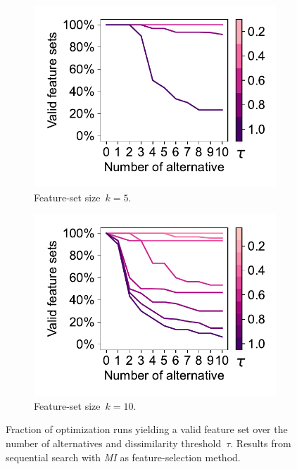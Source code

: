\documentclass{article}
\theoremstyle{definition}
\begin{document}
\begin{figure}[htbp]
	\centering
	\begin{subfigure}[t]{0.48\textwidth}
		\centering
		\includegraphics[width=\textwidth, trim=15 15 10 15, clip]{plots/afs-impact-num-alternatives-tau-optimization-status-k-5.pdf}
		\caption{Feature-set size~$k=5$.}
		\label{fig:afs:impact-num-alternatives-tau-optimization-status-k-5}
	\end{subfigure}
	\hfill
	\begin{subfigure}[t]{0.48\textwidth}
		\centering
		\includegraphics[width=\textwidth, trim=15 15 10 15, clip]{plots/afs-impact-num-alternatives-tau-optimization-status-k-10.pdf}
		\caption{Feature-set size~$k=10$.}
		\label{fig:afs:impact-num-alternatives-tau-optimization-status-k-10}
	\end{subfigure}
	\caption{
		Fraction of optimization runs yielding a valid feature set over the number of alternatives and dissimilarity threshold~$\tau$.
		Results from sequential search with \emph{MI} as feature-selection method.
	}
	\label{fig:afs:impact-num-alternatives-tau-optimization-status}
\end{figure}
\end{document}
